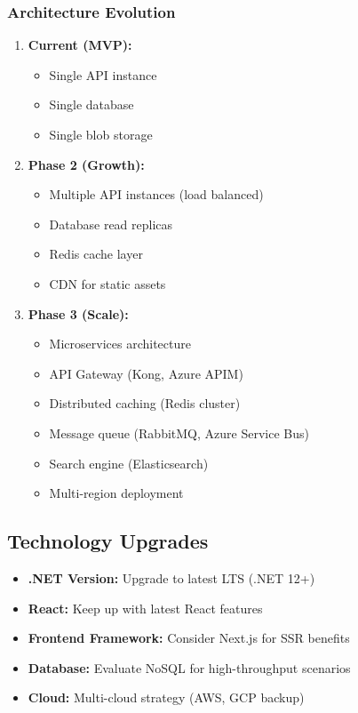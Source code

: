 \subsubsection{Architecture Evolution}
\begin{enumerate}
    \item \textbf{Current (MVP):}
    \begin{itemize}
        \item Single API instance
        \item Single database
        \item Single blob storage
    \end{itemize}

    \item \textbf{Phase 2 (Growth):}
    \begin{itemize}
        \item Multiple API instances (load balanced)
        \item Database read replicas
        \item Redis cache layer
        \item CDN for static assets
    \end{itemize}

    \item \textbf{Phase 3 (Scale):}
    \begin{itemize}
        \item Microservices architecture
        \item API Gateway (Kong, Azure APIM)
        \item Distributed caching (Redis cluster)
        \item Message queue (RabbitMQ, Azure Service Bus)
        \item Search engine (Elasticsearch)
        \item Multi-region deployment
    \end{itemize}
\end{enumerate}

\subsection{Technology Upgrades}

\begin{itemize}
    \item \textbf{.NET Version:} Upgrade to latest LTS (.NET 12+)
    \item \textbf{React:} Keep up with latest React features
    \item \textbf{Frontend Framework:} Consider Next.js for SSR benefits
    \item \textbf{Database:} Evaluate NoSQL for high-throughput scenarios
    \item \textbf{Cloud:} Multi-cloud strategy (AWS, GCP backup)
\end{itemize}

